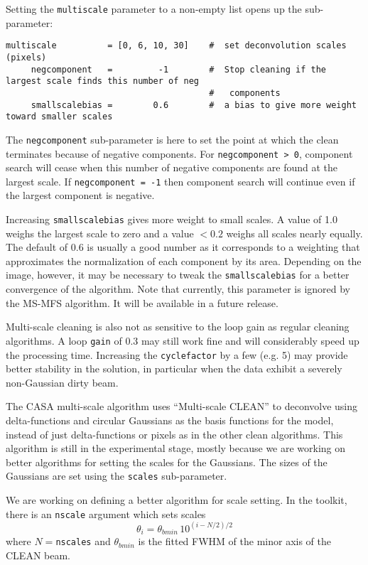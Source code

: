 Setting the {\tt multiscale} parameter to a non-empty list opens up the sub-parameter:
\small
\begin{verbatim}
multiscale          = [0, 6, 10, 30]    #  set deconvolution scales (pixels)
     negcomponent   =         -1        #  Stop cleaning if the largest scale finds this number of neg
                                        #   components
     smallscalebias =        0.6        #  a bias to give more weight toward smaller scales
\end{verbatim}
\normalsize
The {\tt negcomponent} sub-parameter is here to set
the point at which the clean terminates because of negative
components.  For {\tt negcomponent > 0}, component search will cease
when this number of negative components are found at the largest
scale.  If {\tt negcomponent = -1} then component search will continue
even if the largest component is negative.

Increasing {\tt smallscalebias} gives more weight to small scales.  A
value of 1.0 weighs the largest scale to zero and a value $<0.2$
weighs all scales nearly equally. The default of 0.6 is usually a good
number as it corresponds to a weighting that approximates the
normalization of each component by its area. Depending on the image,
however, it may be necessary to tweak the {\tt smallscalebias} for a
better convergence of the algorithm. Note that currently, this
parameter is ignored by the MS-MFS algorithm. It will be available in a
future release.

Multi-scale cleaning is also not as sensitive to the loop gain as
regular cleaning algorithms. A loop {\tt gain} of 0.3 may still work
fine and will considerably speed up the processing time. Increasing
the {\tt cyclefactor} by a few (e.g. 5) may provide better stability
in the solution, in particular when the data exhibit a severely
non-Gaussian dirty beam.


The CASA multi-scale algorithm uses ``Multi-scale CLEAN'' to
deconvolve using delta-functions and circular Gaussians as the basis
functions for the model, instead of just delta-functions or pixels as
in the other clean algorithms.  This algorithm is still in the
experimental stage, mostly because we are working on better algorithms
for setting the scales for the Gaussians.  The sizes of the Gaussians
are set using the {\tt scales} sub-parameter.  

We are working on defining a better algorithm for scale setting.  In
the toolkit, there is an {\tt nscale} argument which sets scales
\begin{equation}
  \theta_i = \theta_{bmin}\,10^{(i-N/2)/2}
\end{equation}
where $N=${\tt nscales} and $\theta_{bmin}$ is the fitted FWHM of the minor
axis of the CLEAN beam.

